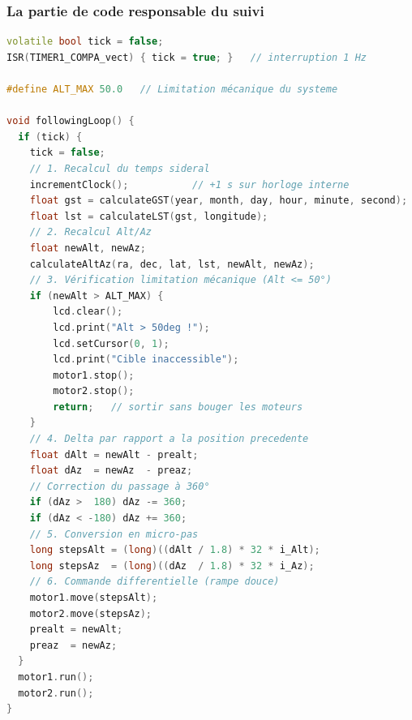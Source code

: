 \documentclass[12pt,a4paper]{report}
\begin{document}
\begin{enumerate}
\subsubsection{La partie de code responsable du suivi}
\begin{lstlisting}[language=C++, caption={La partie de code responsable du suivi}]
volatile bool tick = false;
ISR(TIMER1_COMPA_vect) { tick = true; }   // interruption 1 Hz

#define ALT_MAX 50.0   // Limitation mécanique du systeme

void followingLoop() {
  if (tick) {
    tick = false;
    // 1. Recalcul du temps sideral
    incrementClock();           // +1 s sur horloge interne
    float gst = calculateGST(year, month, day, hour, minute, second);
    float lst = calculateLST(gst, longitude);
    // 2. Recalcul Alt/Az
    float newAlt, newAz;
    calculateAltAz(ra, dec, lat, lst, newAlt, newAz);
    // 3. Vérification limitation mécanique (Alt <= 50°)
    if (newAlt > ALT_MAX) {
        lcd.clear();
        lcd.print("Alt > 50deg !");
        lcd.setCursor(0, 1);
        lcd.print("Cible inaccessible");
        motor1.stop();
        motor2.stop();
        return;   // sortir sans bouger les moteurs
    }
    // 4. Delta par rapport a la position precedente
    float dAlt = newAlt - prealt;
    float dAz  = newAz  - preaz;
    // Correction du passage à 360°
    if (dAz >  180) dAz -= 360;
    if (dAz < -180) dAz += 360;
    // 5. Conversion en micro-pas
    long stepsAlt = (long)((dAlt / 1.8) * 32 * i_Alt);
    long stepsAz  = (long)((dAz  / 1.8) * 32 * i_Az);
    // 6. Commande differentielle (rampe douce)
    motor1.move(stepsAlt);
    motor2.move(stepsAz);
    prealt = newAlt;
    preaz  = newAz;
  }
  motor1.run();
  motor2.run();
}
\end{lstlisting}


\end{enumerate}
\end{document}
